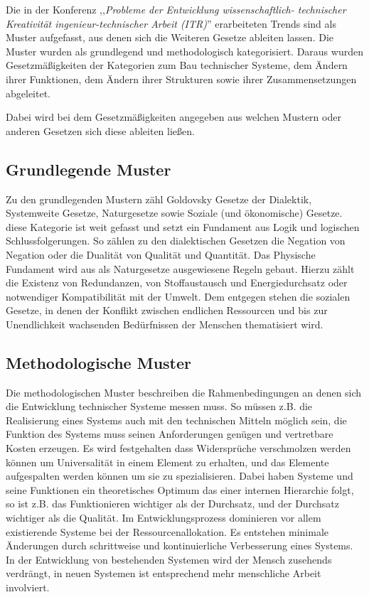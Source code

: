 \documentclass[a4paper,12pt]{article}
\begin{document}
Die in der Konferenz ,,\emph{Probleme der Entwicklung wissenschaftlich- technischer Kreativität ingenieur-technischer Arbeit (ITR)}'' erarbeiteten Trends sind als Muster aufgefasst, aus denen sich die Weiteren Gesetze ableiten lassen. Die Muster wurden als grundlegend und methodologisch kategorisiert. Daraus wurden Gesetzmäßigkeiten der Kategorien zum Bau technischer Systeme, dem Ändern ihrer Funktionen, dem Ändern ihrer Strukturen sowie ihrer Zusammensetzungen abgeleitet. \medskip

Dabei wird bei dem Gesetzmäßigkeiten angegeben aus welchen Mustern oder anderen Gesetzen sich diese ableiten ließen.


\subsection{Grundlegende Muster}

Zu den grundlegenden Mustern zähl Goldovsky Gesetze der Dialektik, Systemweite Gesetze, Naturgesetze sowie Soziale (und ökonomische) Gesetze. diese Kategorie ist weit gefasst und setzt ein Fundament aus Logik und logischen Schlussfolgerungen. So zählen zu den dialektischen Gesetzen die Negation von Negation oder die Dualität von Qualität und Quantität. Das Physische Fundament wird aus als Naturgesetze ausgewiesene Regeln gebaut. Hierzu zählt die Existenz von Redundanzen, von Stoffaustausch und Energiedurchsatz oder notwendiger Kompatibilität mit der Umwelt. Dem entgegen stehen die sozialen Gesetze, in denen der Konflikt zwischen endlichen Ressourcen und bis zur Unendlichkeit wachsenden Bedürfnissen der Menschen thematisiert wird.

\subsection{Methodologische Muster}

Die methodologischen Muster beschreiben die Rahmenbedingungen an denen sich die Entwicklung technischer Systeme messen muss. So müssen z.B. die Realisierung eines Systems auch mit den technischen Mitteln möglich sein, die Funktion des Systems muss seinen Anforderungen genügen und vertretbare Kosten erzeugen. Es wird festgehalten dass Widersprüche verschmolzen werden können um Universalität in einem Element zu erhalten, und das Elemente aufgespalten werden können um sie zu spezialisieren. Dabei haben Systeme und seine Funktionen ein theoretisches Optimum das einer internen Hierarchie folgt, so ist z.B. das Funktionieren wichtiger als der Durchsatz, und der Durchsatz wichtiger als die Qualität. Im Entwicklungsprozess dominieren vor allem existierende Systeme bei der Ressourcenallokation. Es entstehen minimale Änderungen durch schrittweise und kontinuierliche Verbesserung eines Systems. In der Entwicklung von bestehenden Systemen wird der Mensch zusehends verdrängt, in neuen Systemen ist entsprechend mehr menschliche Arbeit involviert.
\end{document}
